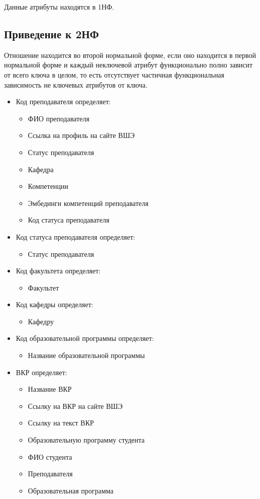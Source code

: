 \documentclass[PI,KR]{HSEUniversity}
\begin{document}
Данные атрибуты находятся в 1НФ.
\subsection{Приведение к 2НФ}
Отношение находится во второй нормальной форме, если оно находится в первой нормальной форме и каждый неключевой атрибут функционально полно зависит от всего ключа в целом, то есть отсутствует частичная функциональная зависимость не ключевых атрибутов от ключа.
\begin{itemize}
	\item Код преподавателя определяет:
	\begin{itemize}
		\item ФИО преподавателя
		\item Ссылка на профиль на сайте ВШЭ	
		\item Статус преподавателя
		\item Кафедра
		\item Компетенции
		\item Эмбединги компетенций преподавателя
		\item Код статуса преподавателя
	\end{itemize}
	\item Код статуса преподавателя определяет:
	\begin{itemize}
		\item Статус преподавателя
	\end{itemize}
	\item Код факультета определяет:
	\begin{itemize}
		\item Факультет
	\end{itemize}
	\item Код кафедры определяет:
	\begin{itemize}
		\item Кафедру
	\end{itemize}
	\item Код образовательной программы определяет:
	\begin{itemize}
		\item Название образовательной программы
	\end{itemize}
	\item ВКР определяет:
	\begin{itemize}
		\item Название ВКР
		\item Ссылку на ВКР на сайте ВШЭ
		\item Ссылку на текст ВКР
		\item Образовательную программу студента
		\item ФИО студента
		\item Преподавателя
		\item Образовательная программа
	\end{itemize}
\end{itemize}
\end{document}
